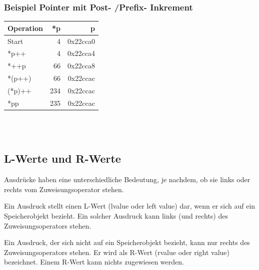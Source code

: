 			\hspace*{0.5cm}
			\begin{minipage}[t]{8 cm}
				\subsubsection{Beispiel Pointer mit Post- /Prefix- Inkrement}
					
					\begin{tabular}{|l|r|r|}
					  \hline
					  Operation &  *p & p \\
					  \hline
					  Start & 4 & 0x22cca0 \\
					  *p++ & 4 & 0x22cca4 \\
					  *++p & 66 & 0x22cca8 \\
					  *(p++) & 66 & 0x22ccac \\
					  (*p)++ & 234 & 0x22ccac \\
					  *pp & 235 & 0x22ccac \\
					  \hline
					\end{tabular}
			\end{minipage}\\\\
				\begin{minipage}[t]{13 cm}
				\subsection{L-Werte und R-Werte}
					\begin{compactitem}
						\item Ausdrücke haben eine unterschiedliche Bedeutung, je nachdem, ob sie links oder rechts vom Zuweisungsoperator stehen.
						\item Ein Ausdruck stellt einen L-Wert (lvalue oder left value) dar, wenn er
						sich auf ein Speicherobjekt bezieht. Ein solcher Ausdruck kann links (und rechts) des Zuweisungsoperators stehen.
						\item Ein Ausdruck, der sich nicht auf ein Speicherobjekt bezieht, kann nur
						rechts des Zuweisungsoperators stehen. Er wird als R-Wert (rvalue oder right value) bezeichnet. Einem R-Wert kann nichts zugewiesen werden.\\
						
					\end{compactitem}
				\end{minipage}
				\hspace*{1cm}
